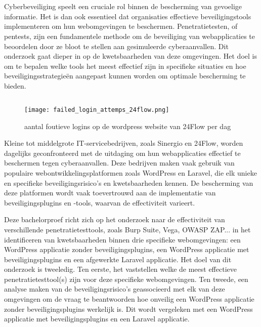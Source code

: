 
\chapter{}%
\label{ch:inleiding}
Cyberbeveiliging speelt een cruciale rol binnen de bescherming van gevoelige informatie. Het is dan ook essentieel dat organisaties 
effectieve beveiligingstools implementeren om hun webomgevingen te beschermen. Penetratietesten, of pentests, zijn een 
fundamentele methode om de beveiliging van webapplicaties te beoordelen door ze bloot te stellen aan gesimuleerde 
cyberaanvallen. Dit onderzoek gaat dieper in op de kwetsbaarheden van deze omgevingen. Het doel is om te bepalen welke tools 
het meest effectief zijn in specifieke situaties en hoe beveiligingsstrategieën aangepast kunnen worden om optimale 
bescherming te bieden.



\section{}%
\label{sec:probleemstelling}

\begin{figure}
  \centering
  \texttt{[image: failed\_login\_attemps\_24flow.png]}
  \caption[aantal foutieve logins op de wordpress website van 24Flow per dag ]{aantal foutieve logins op de wordpress website van 24Flow per dag }
\end{figure}
Kleine tot middelgrote IT-servicebedrijven, zoals Sinergio en 24Flow, worden dagelijks geconfronteerd met de uitdaging om hun 
webapplicaties effectief te beschermen tegen cyberaanvallen. Deze bedrijven maken vaak gebruik van populaire webontwikkelingsplatformen 
zoals WordPress en Laravel, die elk unieke en specifieke beveiligingsrisico's en kwetsbaarheden kennen. De bescherming van deze platformen 
wordt vaak toevertrouwd aan de implementatie van beveiligingsplugins en -tools, waarvan de effectiviteit varieert.

Deze bachelorproef richt zich op het onderzoek naar de effectiviteit van verschillende penetratietesttools, zoals Burp Suite, Vega, OWASP ZAP... 
in het identificeren van kwetsbaarheden binnen drie specifieke webomgevingen: een WordPress applicatie zonder beveiligingsplugins,
een WordPress applicatie met beveiligingsplugins en een afgewerkte Laravel applicatie. Het doel van dit onderzoek is tweeledig. 
Ten eerste, het vaststellen welke de meest effectieve penetratietesttool(s) zijn voor deze specifieke webomgevingen. Ten tweede, 
een analyse maken van de beveiligingsrisico's geassocieerd met elk van deze omgevingen om de vraag te beantwoorden hoe onveilig een 
WordPress applicatie zonder beveiligingsplugins werkelijk is. Dit wordt vergeleken met een WordPress applicatie met 
beveiligingsplugins en een Laravel applicatie.

